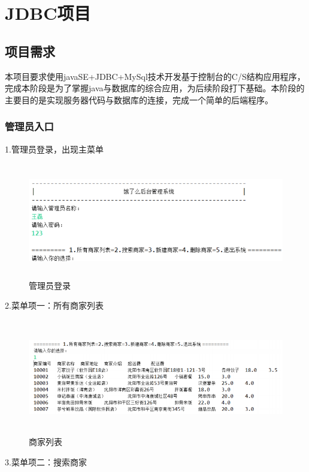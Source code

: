 
\chapter{JDBC项目}
\section{项目需求}
本项目要求使用javaSE+JDBC+MySql技术开发基于控制台的C/S结构应用程序，完成本阶段是为了掌握java与数据库的综合应用，为后续阶段打下基础。本阶段的主要目的是实现服务器代码与数据库的连接，完成一个简单的后端程序。~\\

\subsection{管理员入口}
\noindent
1.管理员登录，出现主菜单

\begin{figure}[H]
    \centering
    \includegraphics[width=12cm,height=5cm]{figures/jdbc1.png}
    \caption{管理员登录}
\end{figure}

\noindent
2.菜单项一：所有商家列表

\begin{figure}[H]
    \centering
    \includegraphics[width=15cm,height=5cm]{figures/jdbc2.png}
    \caption{商家列表}
\end{figure}

\noindent
3.菜单项二：搜索商家

